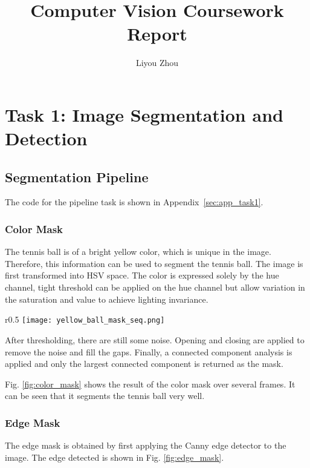 \documentclass{report}
\title{Computer Vision Coursework Report}
\author{Liyou Zhou}
\begin{document}
\maketitle


\chapter{Task 1: Image Segmentation and Detection}

\section{Segmentation Pipeline}

The code for the pipeline task is shown in Appendix~\ref{sec:app_task1}.

\subsection{Color Mask}

The tennis ball is of a bright yellow color, which is unique in the image. Therefore, this information can be used to segment the tennis ball. The image is first transformed into HSV space. The color is expressed solely by the hue channel, tight threshold can be applied on the hue channel but allow variation in the saturation and value to achieve lighting invariance.

\begin{wrapfigure}{r}{0.5\textwidth}
    \centering
    \texttt{[image: yellow\_ball\_mask\_seq.png]}
    \caption{Color mask applied to several frames.}
    \label{fig:color_mask}
\end{wrapfigure}

After thresholding, there are still some noise. Opening and closing are applied to remove the noise and fill the gaps. Finally, a connected component analysis is applied and only the largest connected component is returned as the mask.

Fig. \ref{fig:color_mask} shows the result of the color mask over several frames. It can be seen that it segments the tennis ball very well.



\subsection{Edge Mask}

The edge mask is obtained by first applying the Canny edge detector to the image. The edge detected is shown in Fig. \ref{fig:edge_mask}.
\end{document}
